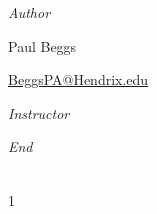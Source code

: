 \documentclass[12pt, oneside]{book}
\begin{document}
\begin{titlepage}
\begin{center}
\begin{large}
            \emph{Author} \\[1ex]
            {\Large Paul Beggs \\ \par} %
            {\href{mailto:BeggsPA@Hendrix.edu}{{BeggsPA@Hendrix.edu}}}\\ %

            \vspace*{1\baselineskip}

            \textit{Instructor} \\[1ex] %
            \professor

            \vspace*{1\baselineskip}

            \textit{End}\\[1ex]
            {\scshape  \customenddate} \\[0.3\baselineskip] %

            \thispagestyle{empty}

        \end{large}
    \end{center}
\end{titlepage}
\pagebreak






\begin{spacing}{1} %
    \renewcommand{\contentsname}{\Large\textbf{Table of Contents}} %
    \markboth{}{} %
    \pagestyle{fancy} %
    \tableofcontents
\end{spacing}

\fancyhead[R]{\leftmark}




\end{document}
